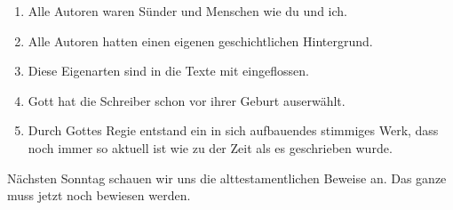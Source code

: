 \begin{otsblock}[Fazit]
\begin{enumerate}
    \item Alle Autoren waren Sünder und Menschen wie du und ich.
    \item Alle Autoren hatten einen eigenen geschichtlichen Hintergrund.
    \item Diese Eigenarten sind in die Texte mit eingeflossen.
    \item Gott hat die Schreiber schon vor ihrer Geburt auserwählt.
    \item Durch Gottes Regie entstand ein in sich aufbauendes stimmiges Werk, dass noch immer so aktuell ist wie zu der Zeit als es geschrieben wurde.
\end{enumerate}
Nächsten Sonntag schauen wir uns die alttestamentlichen Beweise an. Das ganze muss jetzt noch bewiesen werden.
\end{otsblock}